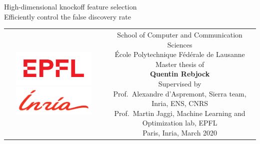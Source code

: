 \begin{titlepage}
\begin{center}
\sffamily


\null\vspace{2cm}
{\huge High-dimensional knockoff feature selection\\[12pt] Efficiently control the false discovery rate} \\[24pt]

\vfill

\begin{tabular} {cc}
\parbox{0.3\textwidth}{
	\includegraphics[width=4cm]{figures/epfl}
	\includegraphics[width=4cm]{figures/inria_cmjn.pdf}
}
&
\parbox{0.7\textwidth}{%
	School of Computer and Communication Sciences\\
	École Polytechnique Fédérale de Lausanne\\
	Master thesis of\\[4pt]
	\null \hspace{3em} \textbf{Quentin Rebjock}\\[9pt]
%
\small
Supervised by\\[4pt]
%
    Prof.\ Alexandre d'Aspremont, Sierra team, Inria, ENS, CNRS\\
    Prof.\ Martin Jaggi, Machine Learning and Optimization lab, EPFL\\[12pt]
%
Paris, Inria, March 2020}
\end{tabular}
\end{center}
\vspace{2cm}
\end{titlepage}
